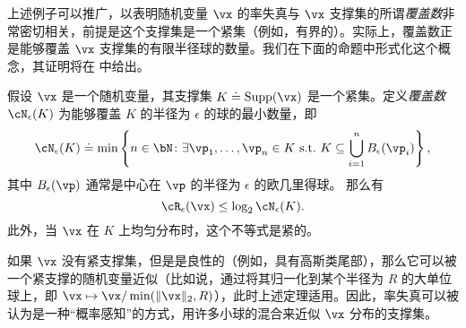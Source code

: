\documentclass[../../book-main.tex]{subfiles}
\begin{document}
上述例子可以推广，以表明随机变量 \(\vx\) 的率失真与 \(\vx\) 支撑集的所谓\textit{覆盖数}非常密切相关，前提是这个支撑集是一个紧集（例如，有界的）。实际上，覆盖数正是能够覆盖 \(\vx\) 支撑集的有限半径球的数量。我们在下面的命题中形式化这个概念，其证明将在  中给出。

\begin{proposition}\label{prop:covering-number-rate-distortion}
	假设 \(\vx\) 是一个随机变量，其支撑集 \(K \doteq \Supp(\vx)\) 是一个紧集。定义\textit{覆盖数} \(\cN_{\epsilon}(K)\) 为能够覆盖 \(K\) 的半径为 \(\epsilon\) 的球的最小数量，即
	\begin{equation}
		\cN_{\epsilon}(K) \doteq \min\left\{n \in \bN \colon \exists \vp_{1}, \dots, \vp_{n} \in K\ \text{s.t.}\ K \subseteq \bigcup_{i = 1}^{n}B_{\epsilon}(\vp_{i})\right\},
	\end{equation}
	其中 \(B_{\epsilon}(\vp)\) 通常是中心在 \(\vp\) 的半径为 \(\epsilon\) 的欧几里得球。
	那么有
	\begin{equation}
		\cR_{\epsilon}(\vx) \leq \log_{2} \cN_{\epsilon}(K).
	\end{equation}
	此外，当 \(\vx\) 在 \(K\) 上均匀分布时，这个不等式是紧的。
\end{proposition}
如果 \(\vx\) 没有紧支撑集，但是是良性的（例如，具有高斯类尾部），那么它可以被一个紧支撑的随机变量近似（比如说，通过将其归一化到某个半径为 \(R\) 的大单位球上，即 \(\vx \mapsto \vx / \min(\|\vx\|_2, R)\)），此时上述定理适用。因此，率失真可以被认为是一种“概率感知”的方式，用许多小球的混合来近似 \(\vx\) 分布的支撑集。
\end{document}
